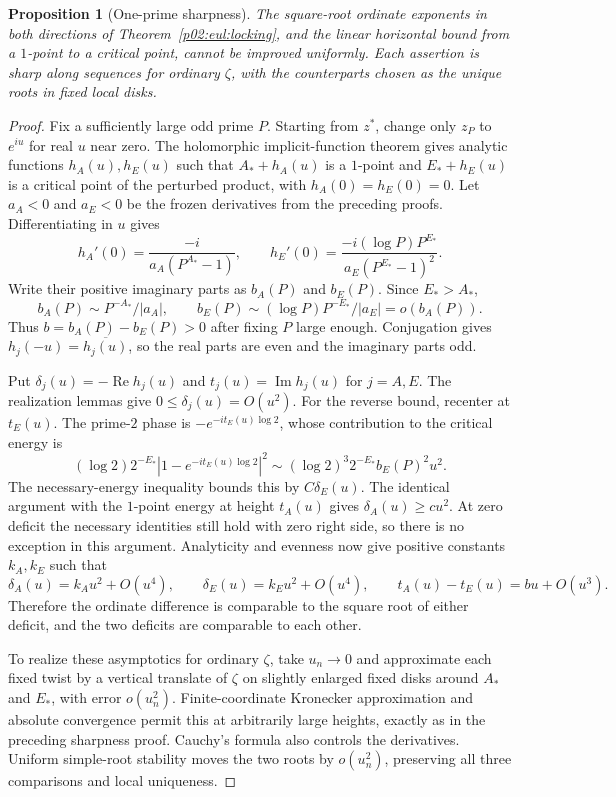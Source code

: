 \documentclass[11pt,letterpaper]{article}
\newtheorem{proposition}[theorem]{Proposition}
\theoremstyle{definition}
\theoremstyle{remark}
\renewcommand{\Re}{\operatorname{Re}}
\renewcommand{\Im}{\operatorname{Im}}
\newcommand{\1}{\mathbf 1}
\begin{document}
\begin{proposition}[One-prime sharpness]\label{p02:eul:vertical-sharpness}
The square-root ordinate exponents in both directions of
Theorem~\ref{p02:eul:locking}, and the linear horizontal bound from a
$1$-point to a critical point, cannot be improved uniformly. Each
assertion is sharp along sequences for ordinary $\zeta$, with the
counterparts chosen as the unique roots in fixed local disks.
\end{proposition}
\begin{proof}
Fix a sufficiently large odd prime $P$. Starting from $z^*$, change
only $z_P$ to $e^{iu}$ for real $u$ near zero. The holomorphic
implicit-function theorem gives analytic functions $h_A(u),h_E(u)$
such that $A_*+h_A(u)$ is a $1$-point and $E_*+h_E(u)$ is a critical
point of the perturbed product, with $h_A(0)=h_E(0)=0$.
Let $a_A<0$ and $a_E<0$ be the frozen derivatives from the preceding
proofs. Differentiating in $u$ gives
\begin{equation}\label{p02:eul:phase-derivatives}
 h_A'(0)=\frac{-i}{a_A(P^{A_*}-1)},\qquad
 h_E'(0)=\frac{-i(\log P)P^{E_*}}
                   {a_E(P^{E_*}-1)^2}.
\end{equation}
Write their positive imaginary parts as $b_A(P)$ and $b_E(P)$.
Since $E_*>A_*$,
\[
 b_A(P)\sim P^{-A_*}/|a_A|,\qquad
 b_E(P)\sim(\log P)P^{-E_*}/|a_E|=o(b_A(P)).
\]
Thus $b=b_A(P)-b_E(P)>0$ after fixing $P$ large enough.
Conjugation gives $h_j(-u)=\overline{h_j(u)}$, so the real parts
are even and the imaginary parts odd.

Put $\delta_j(u)=-\Re h_j(u)$ and $t_j(u)=\Im h_j(u)$ for
$j=A,E$. The realization lemmas give $0\le\delta_j(u)=O(u^2)$.
For the reverse bound, recenter at $t_E(u)$. The prime-$2$ phase is
$-e^{-it_E(u)\log2}$, whose contribution to the critical energy is
\[
 (\log2)2^{-E_*}|1-e^{-it_E(u)\log2}|^2
 \sim (\log2)^3 2^{-E_*}b_E(P)^2u^2.
\]
The necessary-energy inequality bounds this by $C\delta_E(u)$.
The identical argument with the $1$-point energy at height $t_A(u)$
gives $\delta_A(u)\ge cu^2$. At zero deficit the necessary identities
still hold with zero right side, so there is no exception in this
argument. Analyticity and evenness now give positive constants
$k_A,k_E$ such that
\[
 \delta_A(u)=k_Au^2+O(u^4),\qquad
 \delta_E(u)=k_Eu^2+O(u^4),\qquad
 t_A(u)-t_E(u)=bu+O(u^3).
\]
Therefore the ordinate difference is comparable to the square root
of either deficit, and the two deficits are comparable to each other.

To realize these asymptotics for ordinary $\zeta$, take $u_n\to0$
and approximate each fixed twist by a vertical translate of $\zeta$
on slightly enlarged fixed disks around $A_*$ and $E_*$, with error
$o(u_n^2)$. Finite-coordinate Kronecker approximation and absolute
convergence permit this at arbitrarily large heights, exactly as in
the preceding sharpness proof. Cauchy's formula also controls the
derivatives. Uniform simple-root stability moves the two roots by
$o(u_n^2)$, preserving all three comparisons and local uniqueness.
\end{proof}
\end{document}
